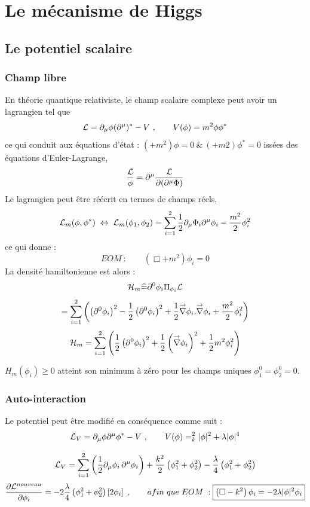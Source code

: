 \section{Le mécanisme de Higgs}
\subsection{Le potentiel scalaire}
\subsubsection{Champ libre}
En théorie quantique relativiste, le champ scalaire complexe peut avoir un lagrangien tel que
\[
\mathcal{L}=\partial_\mu\phi(\partial^\mu)^*-V\ ,\qquad V(\phi)=m^2\phi\phi^*
\]
ce qui conduit aux équations d'état : $( + m^2)\phi = 0\ \&\ ( + m2)\phi^* = 0$
issées des équations d’Euler-Lagrange,
\[
\frac{\mathcal{L}}{\phi}=\partial^\mu\frac{\mathcal{L}}{\partial(\partial^\mu\Phi)}
\]
Le lagrangien peut être réécrit en termes de champs réels,
\[
\mathcal{L}_m(\phi,\phi^*)\;\Leftrightarrow\;\mathcal{L}_m(\phi_1,\phi_2)=
\sum^2_{i=1}\frac{1}{2}\partial_\mu\Phi_i\partial^\mu\phi_i-\frac{m^2}{2}\phi_i^2
\]
ce qui donne :
\[
EOM\ : \qquad \boxed{(\Box+m^2)\phi_i=0}
\]
La densité hamiltonienne est alors :
\[
\mathcal{H}_m\widehat{=}\partial^0\phi_i\Pi_{\phi_i}\mathcal{L}
\]
\[
=\sum^2_{i=1}\left(\left(\partial^0\phi_i\right)^2-\frac{1}{2}\left(\partial^0\phi_i\right)^2+
\frac{1}{2}{\overset{\rightarrow}{\nabla}}\phi_i.{\overset{\rightarrow}{\nabla}}\phi_i+\frac{m^2}{2}\phi_i^2\right)
\]
\[
\mathcal{H}_m=\sum^2_{i=1}\left(\frac{1}{2}\left(\partial^0\phi_i\right)^2+
\frac{1}{2}\left({\overset{\rightarrow}{\nabla}}\phi_i\right)^2+\frac{1}{2}m^2\phi_i^2\right)
\]

$H_m(\phi_i)\geqslant 0$ atteint son minimum à zéro pour les champs uniques $\phi_1^0=\phi_2^0=0$.

\subsubsection{Auto-interaction}
Le potentiel peut être modifié en conséquence comme suit :
\[
\mathcal{L}_V=\partial_\mu\phi\partial^\mu\phi^*-V\ , \qquad V(\phi)=_k^2|\phi|^2+\lambda|\phi|^4
\]

\[
\mathcal{L}_V=\sum^2_{i=1}\left(\frac{1}{2}\partial_\mu\phi_i\,\partial^\mu\phi_i\right) +
\frac{k^2}{2}\left(\phi_1^2+\phi_2^2\right)-
\frac{\lambda}{4}\left(\phi_1^2+\phi_2^2\right)
\]
\[
\frac{\partial\mc{L}^{nouveau}}{\partial\phi_i}=-2\frac{\lambda}{4}
\left(\phi_1^2+\phi_2^2\right)\left[2\phi_i\right]\ ,\qquad afin\ que\ EOM\ :
\boxed{\left(\Box -k^2\right)\phi_i=-2\lambda|\phi|^2\phi_i
}
\]


\subsection{} %
\[
\tag{}   %
\]


